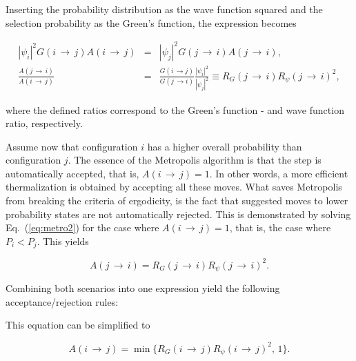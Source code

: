 Inserting the probability distribution as the wave function squared and the selection probability as the Green's function, the expression becomes

\begin{eqnarray}
  \label{eq:metro2}
  |\psi_i|^2G(i\,\rightarrow\,j)A(i\,\rightarrow\,j) &=& |\psi_j|^2G(j\,\rightarrow\,i)A(j\,\rightarrow\,i), \nonumber \\
  \frac{A(j\,\rightarrow\,i)}{A(i\,\rightarrow\,j)} &=& \frac{G(i\,\rightarrow j)}{G(j\,\rightarrow i)}\frac{|\psi_i|^2}{|\psi_j|^2} \equiv R_G(j\,\rightarrow\,i)R_\psi(j\,\rightarrow\,i)^2,
\end{eqnarray}

where the defined ratios correspond to the Green's function - and wave function ratio, respectively. 

Assume now that configuration $i$ has a higher overall probability than configuration $j$. The essence of the Metropolis algorithm is that the step is automatically accepted, that is, $A(i\,\rightarrow\,j) = 1$. In other words, a more efficient thermalization is obtained by accepting all these moves. What saves Metropolis from breaking the criteria of ergodicity, is the fact that suggested moves to lower probability states are not automatically rejected. This is demonstrated by solving Eq.~(\ref{eq:metro2}) for the case where $A(i\,\rightarrow\,j) = 1$, that is, the case where $P_i < P_j$. This yields

\begin{equation*}
 A(j\,\rightarrow\,i) = R_G(j\,\rightarrow\,i)R_\psi(j\,\rightarrow\,i)^2.
\end{equation*}


Combining both scenarios into one expression yield the following acceptance/rejection rules:


This equation can be simplified to

\begin{equation}
  A(i\,\rightarrow\,j) = \min\{R_G(i\,\rightarrow\,j)R_\psi(i\,\rightarrow\,j)^2, \,1\}.
\end{equation}


